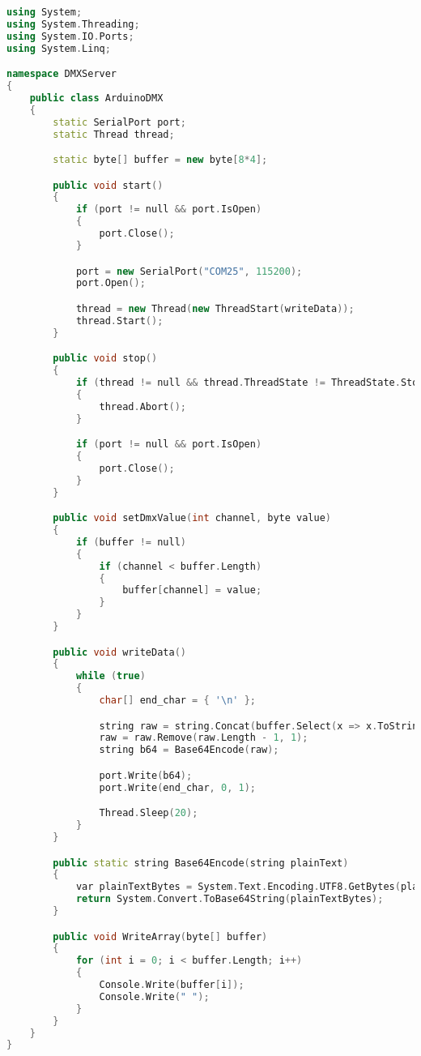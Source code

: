 \begin{lstlisting}[language=C++]
using System;
using System.Threading;
using System.IO.Ports;
using System.Linq;

namespace DMXServer
{
    public class ArduinoDMX
    {
        static SerialPort port;
        static Thread thread;

        static byte[] buffer = new byte[8*4];

        public void start()
        {
            if (port != null && port.IsOpen)
            {
                port.Close();
            }

            port = new SerialPort("COM25", 115200);
            port.Open();

            thread = new Thread(new ThreadStart(writeData));
            thread.Start();
        }

        public void stop()
        {
            if (thread != null && thread.ThreadState != ThreadState.Stopped)
            {
                thread.Abort();
            }

            if (port != null && port.IsOpen)
            {
                port.Close();
            }
        }

        public void setDmxValue(int channel, byte value)
        {
            if (buffer != null)
            {
                if (channel < buffer.Length)
                {
                    buffer[channel] = value;
                }
            }
        }

        public void writeData()
        {
            while (true)
            {
                char[] end_char = { '\n' };

                string raw = string.Concat(buffer.Select(x => x.ToString("000")));
                raw = raw.Remove(raw.Length - 1, 1);
                string b64 = Base64Encode(raw);

                port.Write(b64);
                port.Write(end_char, 0, 1);

                Thread.Sleep(20);
            }
        }

        public static string Base64Encode(string plainText)
        {
            var plainTextBytes = System.Text.Encoding.UTF8.GetBytes(plainText);
            return System.Convert.ToBase64String(plainTextBytes);
        }

        public void WriteArray(byte[] buffer)
        {
            for (int i = 0; i < buffer.Length; i++)
            {
                Console.Write(buffer[i]);
                Console.Write(" ");
            }
        }
    }
}

\end{lstlisting}



